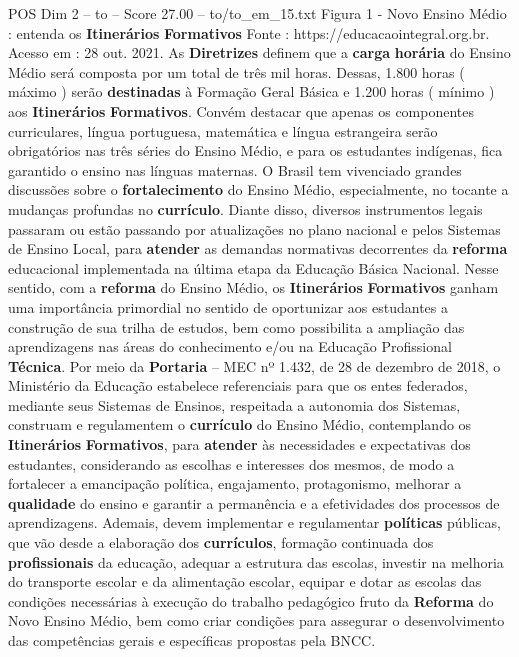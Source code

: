 \begin{textsample}{POS Dim 2 – to – Score 27.00 – to/to\_em\_15.txt}
Figura 1 - Novo Ensino Médio : entenda os \textbf{Itinerários} \textbf{Formativos} Fonte : https://educacaointegral.org.br.
Acesso em : 28 out. 2021.
As \textbf{Diretrizes} definem que a \textbf{carga} \textbf{horária} do Ensino Médio será composta por um total de três mil horas.
Dessas, 1.800 horas ( máximo ) serão \textbf{destinadas} à Formação Geral Básica e 1.200 horas ( mínimo ) aos \textbf{Itinerários} \textbf{Formativos}.
Convém destacar que apenas os componentes curriculares, língua portuguesa, matemática e língua estrangeira serão obrigatórios nas três séries do Ensino Médio, e para os estudantes indígenas, fica garantido o ensino nas línguas maternas.
O Brasil tem vivenciado grandes discussões sobre o \textbf{fortalecimento} do Ensino Médio, especialmente, no tocante a mudanças profundas no \textbf{currículo}.
Diante disso, diversos instrumentos legais passaram ou estão passando por atualizações no plano nacional e pelos Sistemas de Ensino Local, para \textbf{atender} as demandas normativas decorrentes da \textbf{reforma} educacional implementada na última etapa da Educação Básica Nacional.
Nesse sentido, com a \textbf{reforma} do Ensino Médio, os \textbf{Itinerários} \textbf{Formativos} ganham uma importância primordial no sentido de oportunizar aos estudantes a construção de sua trilha de estudos, bem como possibilita a ampliação das aprendizagens nas áreas do conhecimento e/ou na Educação Profissional \textbf{Técnica}.
Por meio da \textbf{Portaria} – MEC nº 1.432, de 28 de dezembro de 2018, o Ministério da Educação estabelece referenciais para que os entes federados, mediante seus Sistemas de Ensinos, respeitada a autonomia dos Sistemas, construam e regulamentem o \textbf{currículo} do Ensino Médio, contemplando os \textbf{Itinerários} \textbf{Formativos}, para \textbf{atender} às necessidades e expectativas dos estudantes, considerando as escolhas e interesses dos mesmos, de modo a fortalecer a emancipação política, engajamento, protagonismo, melhorar a \textbf{qualidade} do ensino e garantir a permanência e a efetividades dos processos de aprendizagens.
Ademais, devem implementar e regulamentar \textbf{políticas} públicas, que vão desde a elaboração dos \textbf{currículos}, formação continuada dos \textbf{profissionais} da educação, adequar a estrutura das escolas, investir na melhoria do transporte escolar e da alimentação escolar, equipar e dotar as escolas das condições necessárias à execução do trabalho pedagógico fruto da \textbf{Reforma} do Novo Ensino Médio, bem como criar condições para assegurar o desenvolvimento das competências gerais e específicas propostas pela BNCC.

\end{textsample}
